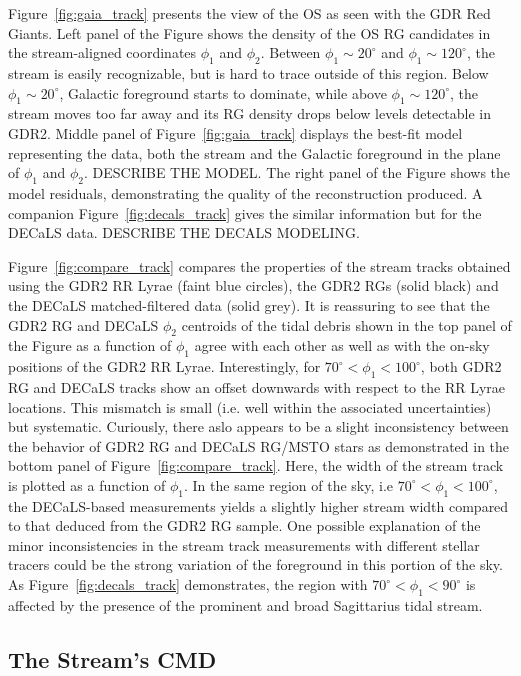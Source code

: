\documentclass[a4paper,useAMS,usenatbib]{mnras}
\begin{document}
Figure~\ref{fig:gaia_track} presents the view of the OS as seen with
the GDR Red Giants. Left panel of the Figure shows the density of the
OS RG candidates in the stream-aligned coordinates $\phi_1$ and
$\phi_2$. Between $\phi_1\sim20^{\circ}$ and $\phi_1\sim120^{\circ}$,
the stream is easily recognizable, but is hard to trace outside of
this region. Below $\phi_1\sim20^{\circ}$, Galactic foreground starts
to dominate, while above $\phi_1\sim120^{\circ}$, the stream moves too
far away and its RG density drops below levels detectable in
GDR2. Middle panel of Figure~\ref{fig:gaia_track} displays the
best-fit model representing the data, both the stream and the Galactic
foreground in the plane of $\phi_1$ and $\phi_2$. DESCRIBE THE
MODEL. The right panel of the Figure shows the model residuals,
demonstrating the quality of the reconstruction produced. A companion
Figure~\ref{fig:decals_track} gives the similar information but for
the DECaLS data. DESCRIBE THE DECALS MODELING.

Figure~\ref{fig:compare_track} compares the properties of the stream
tracks obtained using the GDR2 RR Lyrae (faint blue circles), the GDR2
RGs (solid black) and the DECaLS matched-filtered data (solid
grey). It is reassuring to see that the GDR2 RG and DECaLS $\phi_2$
centroids of the tidal debris shown in the top panel of the Figure as
a function of $\phi_1$ agree with each other as well as with the
on-sky positions of the GDR2 RR Lyrae. Interestingly, for
$70^{\circ}<\phi_1<100^{\circ}$, both GDR2 RG and DECaLS tracks show
an offset downwards with respect to the RR Lyrae locations. This
mismatch is small (i.e. well within the associated uncertainties) but
systematic. Curiously, there aslo appears to be a slight inconsistency
between the behavior of GDR2 RG and DECaLS RG/MSTO stars as
demonstrated in the bottom panel of
Figure~\ref{fig:compare_track}. Here, the width of the stream track is
plotted as a function of $\phi_1$. In the same region of the sky, i.e
$70^{\circ}<\phi_1<100^{\circ}$, the DECaLS-based measurements yields
a slightly higher stream width compared to that deduced from the GDR2
RG sample. One possible explanation of the minor inconsistencies in
the stream track measurements with different stellar tracers could be
the strong variation of the foreground in this portion of the sky. As
Figure~\ref{fig:decals_track} demonstrates, the region with
$70^{\circ}<\phi_1<90^{\circ}$ is affected by the presence of the
prominent and broad Sagittarius tidal stream.

\subsection{The Stream's CMD}
\end{document}
